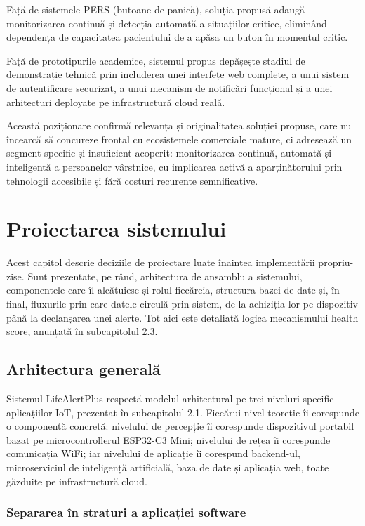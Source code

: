 ﻿\documentclass[12pt,a4paper,twoside]{article}
\begin{document}
Față de sistemele PERS (butoane de panică), soluția propusă adaugă monitorizarea continuă și detecția automată a situațiilor critice, eliminând dependența de capacitatea pacientului de a apăsa un buton în momentul critic.

Față de prototipurile academice, sistemul propus depășește stadiul de demonstrație tehnică prin includerea unei interfețe web complete, a unui sistem de autentificare securizat, a unui mecanism de notificări funcțional și a unei arhitecturi deployate pe infrastructură cloud reală.

Această poziționare confirmă relevanța și originalitatea soluției propuse, care nu încearcă să concureze frontal cu ecosistemele comerciale mature, ci adresează un segment specific și insuficient acoperit: monitorizarea continuă, automată și inteligentă a persoanelor vârstnice, cu implicarea activă a aparținătorului prin tehnologii accesibile și fără costuri recurente semnificative.

\newpage
\section{Proiectarea sistemului}

Acest capitol descrie deciziile de proiectare luate înaintea implementării propriu-zise. Sunt prezentate, pe rând, arhitectura de ansamblu a sistemului, componentele care îl alcătuiesc și rolul fiecăreia, structura bazei de date și, în final, fluxurile prin care datele circulă prin sistem, de la achiziția lor pe dispozitiv până la declanșarea unei alerte. Tot aici este detaliată logica mecanismului health score, anunțată în subcapitolul 2.3.

\subsection{Arhitectura generală}

Sistemul LifeAlertPlus respectă modelul arhitectural pe trei niveluri specific aplicațiilor IoT, prezentat în subcapitolul 2.1. Fiecărui nivel teoretic îi corespunde o componentă concretă: nivelului de percepție îi corespunde dispozitivul portabil bazat pe microcontrollerul ESP32-C3 Mini; nivelului de rețea îi corespunde comunicația WiFi; iar nivelului de aplicație îi corespund backend-ul, microserviciul de inteligență artificială, baza de date și aplicația web, toate găzduite pe infrastructură cloud.

\subsubsection{Separarea în straturi a aplicației software}
\end{document}
